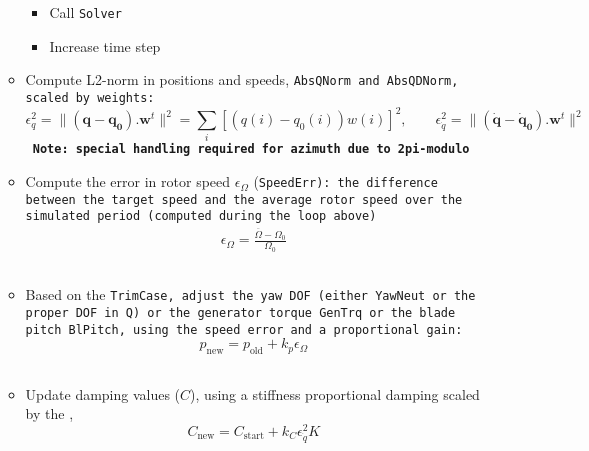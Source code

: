 \documentclass[11pt]{article}
\begin{document}
\begin{itemize}
\begin{itemize}
                \begin{itemize} \tightlist
                    \item Call \tt{Solver}
                    \item Increase time step
                \end{itemize}
            \item Compute L2-norm in positions and speeds, \tt{AbsQNorm} and
                \tt{AbsQDNorm}, scaled by weights:
                \[\epsilon_q^2 = \rVert (\boldsymbol{q}-\boldsymbol{q_0}). \boldsymbol{w}^t\lVert^2 = \sum_i \left[(q(i)-q_0(i)) w(i) \right]^2
                    ,\qquad \epsilon_{\dot{q}}^2 = \rVert (\boldsymbol{\dot{q}}-\boldsymbol{\dot{q}_0}). \boldsymbol{w}^t\lVert^2
                \] \textbf{Note: special handling required for azimuth due to
                2pi-modulo}
            \item Compute the error in rotor speed \(\epsilon_\Omega\)
                (\tt{SpeedErr}): the difference between the target speed and the
                average rotor speed over the simulated period (computed during the
                loop above)
                \begin{align}
                    \epsilon_\Omega = \frac{\overline{\Omega} - \Omega_0}{\Omega_0}
                \end{align}
            \item Based on the \tt{TrimCase}, adjust the yaw DOF (either
                \tt{YawNeut} or the proper DOF in \tt{Q}) or the generator
                torque \tt{GenTrq} or the blade pitch \tt{BlPitch}, using
                the speed error and a proportional gain:
                \[ p_\text{new} = p_\text{old} + k_p \epsilon_\Omega\]
            \item Update damping values (\(C\)), using a stiffness proportional
                damping scaled by the ,
                \[ C_\text{new} = C_\text{start} + k_C \epsilon_{\dot{q}}^2 K\]
        \end{itemize}
\end{itemize}
\end{document}
